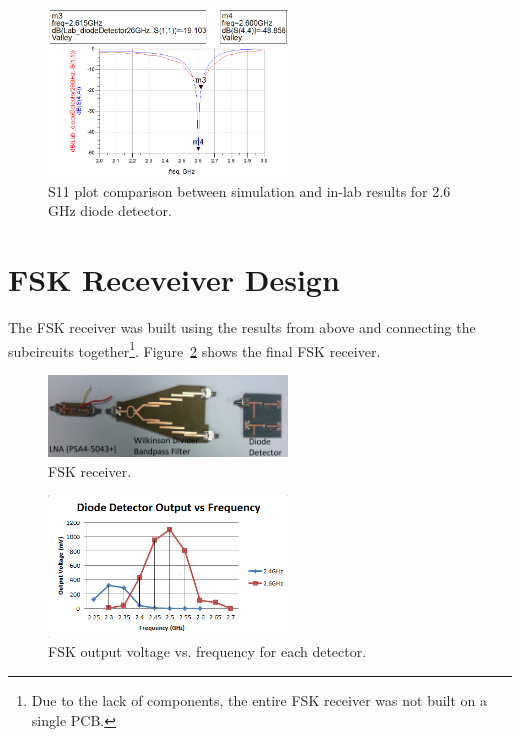 \documentclass[conference]{IEEEtran}
\begin{document}
\begin{figure}[!htb]
\centering
\includegraphics[width=2.5in]{diode-pics/diodedetectorLab26S11.png}
\caption{S11 plot comparison between simulation and in-lab results for 2.6 GHz diode detector.}
\label{fig:resultS1126}
\end{figure}

\section{FSK Receveiver Design}
The FSK receiver was built using the results from above and connecting the subcircuits together\footnote{Due to the lack of components, the entire FSK receiver was not built on a single PCB.}. Figure~\ref{fig:fsk} shows the final FSK receiver.

\begin{figure}[!htb]
\centering
\includegraphics[width=2.5in]{fsk.jpg}
\caption{FSK receiver.}
\label{fig:fsk}
\end{figure}

\begin{figure}[!htb]
\centering
\includegraphics[width=2.5in]{diode-pics/output_chart.PNG}
\caption{FSK output voltage vs. frequency for each detector.}
\label{fig:fsk_chart}
\end{figure}
\end{document}
